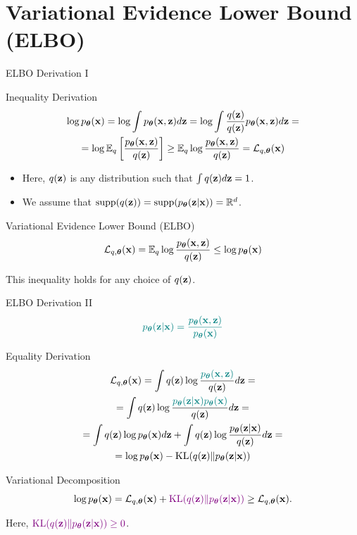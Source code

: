 \documentclass{beamer}
\renewcommand{\eqpause}{}
\renewcommand{\nextonslide}[1]{#1}
\begin{document}
\section{Variational Evidence Lower Bound (ELBO)}
\begin{frame}{ELBO Derivation I}
	\begin{block}{Inequality Derivation}
		\vspace{-0.7cm}
		\begin{multline*}
			\log \pt(\bx) 
			= \log \int \pt(\bx, \bz) d\bz 
			\nextonslide{= \log \int \frac{q(\bz)}{q(\bz)} \pt(\bx, \bz) d\bz}
			\nextonslide{= \\ = \log \bbE_{q} \left[\frac{\pt(\bx, \bz)}{q(\bz)} \right]}
			\nextonslide{ \geq \bbE_{q} \log \frac{\pt(\bx, \bz)}{q(\bz)} = \cL_{q, \btheta}(\bx)}
		\end{multline*}
		\vspace{-0.3cm}
	\end{block}
    \eqpause
	\begin{itemize}
		\item Here, $q(\mathbf{z})$ is any distribution such that $\int q(\mathbf{z}) d\mathbf{z} = 1$.
		\item {\color{gray} We assume that $\text{supp}(q(\mathbf{z})) = \text{supp}(p_{\boldsymbol{\theta}}(\mathbf{z} | \mathbf{x})) = \mathbb{R}^{d}$}.
	\end{itemize}
    \eqpause
	\begin{block}{Variational Evidence Lower Bound (ELBO)}
		\[
			 \mathcal{L}_{q, \boldsymbol{\theta}}(\mathbf{x}) = \mathbb{E}_{q} \log \frac{p_{\boldsymbol{\theta}}(\mathbf{x}, \mathbf{z})}{q(\mathbf{z})}  \leq \log p_{\boldsymbol{\theta}}(\mathbf{x}) 
		\]
    	\eqpause
		This inequality holds for any choice of $q(\mathbf{z})$.
	\end{block}
\end{frame}
\begin{frame}{ELBO Derivation II}
	\vspace{-0.3cm}
	\[
		{\color{teal}p_{\boldsymbol{\theta}}(\mathbf{z}|\mathbf{x}) = \frac{p_{\boldsymbol{\theta}}(\mathbf{x}, \mathbf{z})}{p_{\boldsymbol{\theta}}(\mathbf{x})}}
	\]
	\vspace{-0.4cm}
	\begin{block}{Equality Derivation}
		\vspace{-0.7cm}
		\begin{multline*}
			\cL_{q, \btheta}(\bx) = \int q(\bz) \log \frac{\color{teal}\pt(\bx, \bz)}{q(\bz)}d\bz 
			\nextonslide{= \\ = \int q(\bz) \log \frac{\color{teal}\pt(\bz|\bx)\pt(\bx)}{q(\bz)}d\bz}
			\nextonslide{ = \\ = \int q(\bz) \log \pt(\bx) d\bz + \int q(\bz) \log \frac{\pt(\bz|\bx)}{q(\bz)}d\bz}
			\nextonslide{ = \\ = \log \pt(\bx) - \KL(q(\bz) \| \pt(\bz|\bx))}
		\end{multline*}
	\end{block}
    \eqpause
	\vspace{-0.7cm}
	\begin{block}{Variational Decomposition}
		\vspace{-0.2cm}
		\[
			\log p_{\boldsymbol{\theta}}(\mathbf{x}) = \mathcal{L}_{q, \boldsymbol{\theta}}(\mathbf{x}) + {\color{violet}\mathrm{KL}(q(\mathbf{z}) \| p_{\boldsymbol{\theta}}(\mathbf{z}|\mathbf{x}))} \geq \mathcal{L}_{q, \boldsymbol{\theta}}(\mathbf{x}).
		\]
	\end{block}
    \eqpause
	Here, ${\color{violet}\mathrm{KL}(q(\mathbf{z}) \| p_{\boldsymbol{\theta}}(\mathbf{z}|\mathbf{x})) \geq 0}$.
\end{frame}
\end{document}
